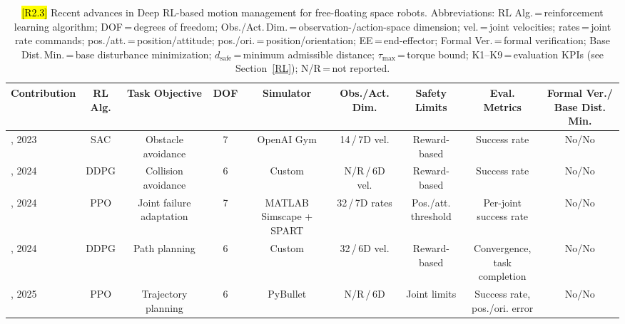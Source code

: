 \documentclass{ieeeaccess}
\newcommand{\hltwo}[1]{{\sethlcolor{rtwo}\hl{#1}}}
\begin{document}
\begin{table}[!t]
	\centering
	\caption{\hltwo{[R2.3]} Recent advances in Deep RL-based motion management for free-floating space robots.
  Abbreviations: RL Alg.\,=\,reinforcement learning algorithm; DOF\,=\,degrees of freedom;
  Obs./Act.\,Dim.\,=\,observation-/action-space dimension; vel.\,=\,joint velocities;
  rates\,=\,joint rate commands; pos./att.\,=\,position/attitude; pos./ori.\,=\,position/orientation;
  EE\,=\,end-effector; Formal Ver.\,=\,formal verification; Base Dist.\,Min.\,=\,base disturbance minimization;
  $d_\text{safe}$\,=\,minimum admissible distance; $\tau_\text{max}$\,=\,torque bound;
  K1--K9\,=\,evaluation KPIs (see Section~\ref{RL}); N/R\,=\,not reported.}
	\label{tab:sample}
	\scriptsize
	\renewcommand{\arraystretch}{1.25}
	\begin{tabular}{lcccccccc}
		\toprule
		\textbf{Contribution} & \makecell{\textbf{RL}\\\textbf{Alg.}} & \textbf{Task Objective} & \textbf{DOF} & \textbf{Simulator} & \makecell{\textbf{Obs./Act.}\\\textbf{Dim.}} & \makecell{\textbf{Safety}\\\textbf{Limits}} & \makecell{\textbf{Eval.}\\\textbf{Metrics}} & \makecell{\textbf{Formal Ver./}\\\textbf{Base Dist. Min.}} \\
		\midrule
		\cite{huang2023obstacle}, 2023 & SAC & Obstacle avoidance & 7 & OpenAI Gym & 14\,/\,7D vel. & Reward-based & Success rate & No/No \\
		\cite{al2024reinforcement}, 2024 & DDPG & Collision avoidance & 6 & Custom & N/R\,/\,6D vel. & Reward-based & Success rate & No/No \\
		\cite{d2024failure}, 2024 & PPO & \makecell{Joint failure\\adaptation} & 7 & \makecell{MATLAB\\Simscape + SPART} & 32\,/\,7D rates & \makecell{Pos./att.\\threshold} & \makecell{Per-joint\\success rate} & No/No \\
		\cite{al2024path}, 2024 & DDPG & Path planning & 6 & Custom & 32\,/\,6D vel. & Reward-based & \makecell{Convergence,\\task completion} & No/No \\
		\cite{hu2025deep}, 2025 & PPO & Trajectory planning & 6 & PyBullet & N/R\,/\,6D & Joint limits & \makecell{Success rate,\\pos./ori. error} & No/No \\

\end{tabular}
\end{table}
\end{document}
